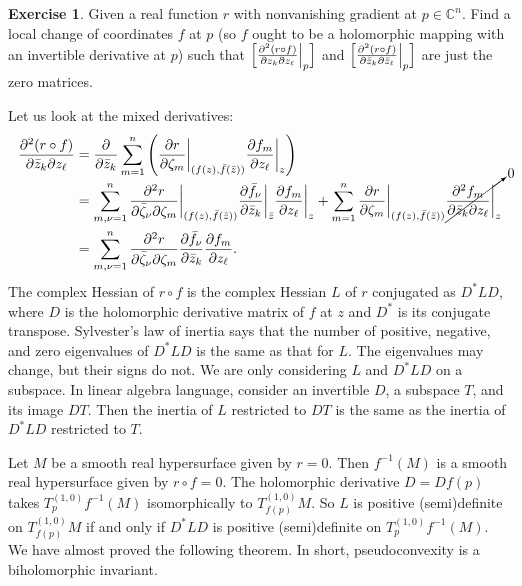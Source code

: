 \documentclass[12pt,openany]{book}
\newcommand{\C}{{\mathbb{C}}}
\theoremstyle{plain}
\theoremstyle{remark}
\theoremstyle{definition}
\newenvironment{exbox}{%
    \def\FrameCommand{\vrule width 1pt \relax\hspace{10pt}}%
    \MakeFramed{\advance\hsize-\width\FrameRestore}%
}{%
    \endMakeFramed
}
\theoremstyle{exercise}
\newtheorem{exercise}{Exercise}[section]
\theoremstyle{example}
\begin{document}
\begin{exbox}
\begin{exercise}
Given a real function $r$ with nonvanishing gradient at $p \in \C^n$.  Find
a local change of coordinates $f$ at $p$ (so $f$ ought to be a holomorphic
mapping with an invertible derivative at $p$) such that
$\Bigl[ \frac{\partial^2 (r \circ f)}{\partial z_k \partial z_\ell} \Big|_p
\Bigr]$
and
$\Bigl[ \frac{\partial^2 (r \circ f)}{\partial \bar{z}_k \partial \bar{z}_\ell}
\Big|_p \Bigr]$
are just the zero matrices.
\end{exercise}
\end{exbox}

Let us look at the mixed derivatives:
\begin{equation*}
\begin{split}
\frac{\partial^2 (r \circ f)}{\partial \bar{z}_k \partial z_\ell}
& =
\frac{\partial}{\partial \bar{z}_k }
\sum_{m=1}^n
\left(
\frac{\partial r}{\partial \zeta_m} \bigg|_{(f(z),\bar{f}(\bar{z}))}
\frac{\partial f_m}{\partial z_\ell} \bigg|_z
\right)
\\
& =
\sum_{m,\nu=1}^n
\frac{\partial^2 r}{\partial \bar{\zeta}_\nu \partial \zeta_m }
\bigg|_{(f(z),\bar{f}(\bar{z}))}
\frac{\partial \bar{f}_\nu}{\partial \bar{z}_k} \bigg|_{\bar{z}}
\frac{\partial f_m}{\partial z_\ell} \bigg|_z
+
\sum_{m=1}^n
\frac{\partial r}{\partial \zeta_m} \bigg|_{(f(z),\bar{f}(\bar{z}))}
\smash{\cancelto{0}{\frac{\partial^2 f_m}{\partial \bar{z}_k \partial
z_\ell} \bigg|_z}}
\\
&=
\sum_{m,\nu=1}^n
\frac{\partial^2 r}{\partial \bar{\zeta}_\nu \partial \zeta_m}
\frac{\partial \bar{f}_\nu}{\partial \bar{z}_k}
\frac{\partial f_m}{\partial z_\ell} .
\end{split}
\end{equation*}
The complex Hessian of $r \circ f$ is the complex Hessian $L$ of $r$
conjugated as $D^*LD$, where $D$ is the holomorphic
derivative matrix of $f$ at $z$ and
$D^*$ is its conjugate transpose.  Sylvester's law of inertia
says that the number of positive, negative, and zero
eigenvalues of $D^*LD$ is the same as that for $L$.  The
eigenvalues may change, but their signs do not.
We are only considering $L$ and $D^*LD$ on a subspace.  In linear algebra
language, consider an invertible $D$, a subspace $T$, and its image $DT$.
Then the inertia of $L$ restricted to $DT$ is the same
as the inertia of $D^*LD$ restricted to $T$.

Let $M$ be a smooth real hypersurface given by $r=0$.
Then $f^{-1}(M)$ is
a smooth real hypersurface given by $r \circ f = 0$.
The holomorphic derivative $D = Df(p)$
takes
$T_{p}^{(1,0)}f^{-1}(M)$ isomorphically to $T_{f(p)}^{(1,0)}M$.
So $L$ is positive (semi)definite
on $T_{f(p)}^{(1,0)}M$ if and only if $D^*LD$ is positive (semi)definite
on $T_{p}^{(1,0)} f^{-1}(M)$.
We have almost proved the following theorem.  In short, pseudoconvexity is a
biholomorphic invariant.
\end{document}
